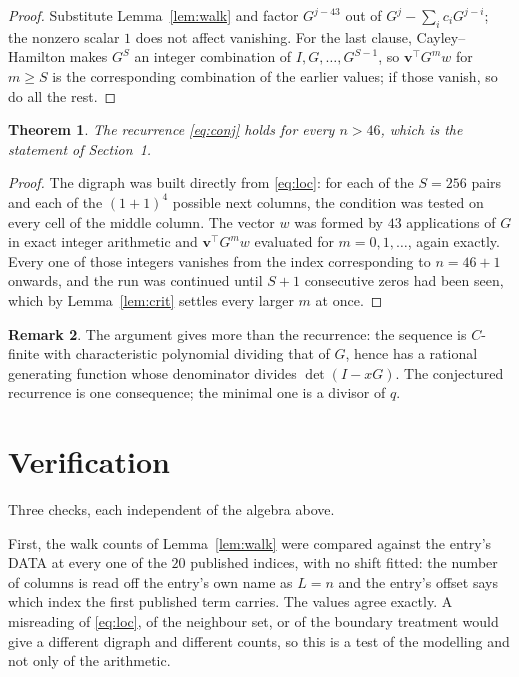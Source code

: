 \documentclass[11pt,a4paper]{article}
\theoremstyle{plain}
\newtheorem{theorem}{Theorem}
\theoremstyle{definition}
\newtheorem{remark}[theorem]{Remark}
\begin{document}
\begin{proof}
Substitute Lemma~\ref{lem:walk} and factor $G^{j-43}$ out of
$G^{j}-\sum_ic_iG^{j-i}$; the nonzero scalar $1$ does not affect
vanishing. For the last clause, Cayley--Hamilton makes $G^{S}$ an integer combination of
$I,G,\dots,G^{S-1}$, so $\mathbf{v}^{\!\top}G^{m}w$ for $m\ge S$ is the corresponding
combination of the earlier values; if those vanish, so do all the rest.
\end{proof}

\begin{theorem}
The recurrence \eqref{eq:conj} holds for every $n>46$, which is the statement of
Section~1.
\end{theorem}

\begin{proof}
The digraph was built directly from \eqref{eq:loc}: for each of the $S=256$ pairs and each
of the $(1+1)^{4}$ possible next columns, the condition was tested on every cell of
the middle column. The vector $w$ was formed by $43$ applications of $G$ in exact integer
arithmetic and $\mathbf{v}^{\!\top}G^{m}w$ evaluated for $m=0,1,\dots$, again exactly.
Every one of those integers vanishes from the index corresponding to $n=46+1$ onwards,
and the run was continued until $S+1$ consecutive zeros had been seen, which by
Lemma~\ref{lem:crit} settles every larger $m$ at once.
\end{proof}

\begin{remark}
The argument gives more than the recurrence: the sequence is $C$-finite with characteristic
polynomial dividing that of $G$, hence has a rational generating function whose denominator
divides $\det(I-xG)$. The conjectured recurrence is one consequence; the minimal one is a
divisor of $q$.
\end{remark}

\section{Verification}

Three checks, each independent of the algebra above.

First, the walk counts of Lemma~\ref{lem:walk} were compared against the entry's DATA at
every one of the $20$ published indices, with no shift fitted: the number of columns is
read off the entry's own name as $L=n$ and the entry's offset says which index the first
published term carries. The values agree exactly. A misreading of \eqref{eq:loc}, of the
neighbour set, or of the boundary treatment would give a different digraph and different
counts, so this is a test of the modelling and not only of the arithmetic.
\end{document}
